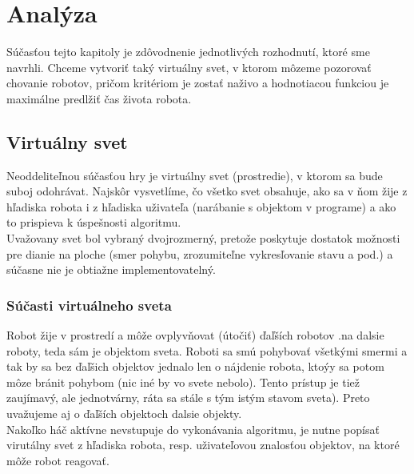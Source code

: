 \chapter{Analýza}
Súčasťou tejto kapitoly je zdôvodnenie jednotlivých rozhodnutí, ktoré sme navrhli. Chceme vytvoriť taký virtuálny svet, v ktorom môzeme pozorovať chovanie robotov, pričom kritériom je zostať naživo a hodnotiacou funkciou je maximálne predlžiť čas života robota.
\section{Virtuálny svet}
Neoddeliteľnou súčasťou hry je virtuálny svet (prostredie), v ktorom sa bude suboj odohrávat. Najskôr vysvetlíme, čo všetko svet obsahuje, ako sa v ňom žije z hľadiska robota i z hľadiska uživateľa (narábanie s objektom v programe) a ako to prispieva k úspešnosti algoritmu. \\ 
Uvažovany svet bol vybraný dvojrozmerný, pretože poskytuje dostatok možnosti pre dianie na ploche (smer pohybu, zrozumiteľne vykresľovanie stavu a pod.) a súčasne nie je obtiažne implementovatelný. 
\subsection{Súčasti virtuálneho sveta} %
Robot žije v prostredí a môže ovplyvňovat (útočiť) ďaľších robotov .na dalsie roboty, teda sám je objektom sveta. Roboti sa smú pohybovať všetkými smermi a tak by sa bez ďaľšich objektov jednalo len o nájdenie robota, ktoýy sa potom môze bránit pohybom (nic iné by vo svete nebolo). Tento prístup je tiež zaujímavý, ale jednotvárny, ráta sa stále s tým istým stavom sveta). Preto uvažujeme aj o ďaľších objektoch dalsie objekty. \\%
Nakoľko háč aktívne nevstupuje do vykonávania algoritmu, je nutne popísať virutálny svet z hľadiska robota, resp. uživateľovou znalosťou objektov, na ktoré môže robot reagovať. 

